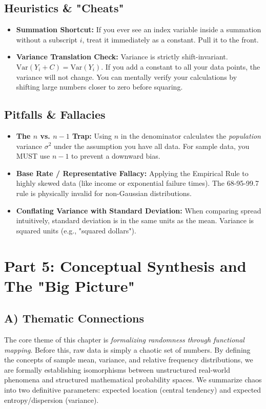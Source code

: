 \documentclass[11pt]{article}
\theoremstyle{definition}
\theoremstyle{remark}
\newcommand{\Var}{\text{Var}}
\begin{document}
\subsection{Heuristics \& "Cheats"}
\begin{itemize}
    \item \textbf{Summation Shortcut:} If you ever see an index variable inside a summation without a subscript $i$, treat it immediately as a constant. Pull it to the front.
    \item \textbf{Variance Translation Check:} Variance is strictly shift-invariant. $\Var(Y_i + C) = \Var(Y_i)$. If you add a constant to all your data points, the variance will not change. You can mentally verify your calculations by shifting large numbers closer to zero before squaring.
\end{itemize}

\subsection{Pitfalls \& Fallacies}
\begin{itemize}
    \item \textbf{The $n$ vs. $n-1$ Trap:} Using $n$ in the denominator calculates the \textit{population} variance $\sigma^2$ under the assumption you have all data. For sample data, you MUST use $n-1$ to prevent a downward bias.
    \item \textbf{Base Rate / Representative Fallacy:} Applying the Empirical Rule to highly skewed data (like income or exponential failure times). The 68-95-99.7 rule is physically invalid for non-Gaussian distributions.
    \item \textbf{Conflating Variance with Standard Deviation:} When comparing spread intuitively, standard deviation is in the same units as the mean. Variance is squared units (e.g., "squared dollars").
\end{itemize}


\section{Part 5: Conceptual Synthesis and The "Big Picture"}

\subsection{A) Thematic Connections}
The core theme of this chapter is \textit{formalizing randomness through functional mapping}. Before this, raw data is simply a chaotic set of numbers. By defining the concepts of sample mean, variance, and relative frequency distributions, we are formally establishing isomorphisms between unstructured real-world phenomena and structured mathematical probability spaces. We summarize chaos into two definitive parameters: expected location (central tendency) and expected entropy/dispersion (variance). 
\end{document}
